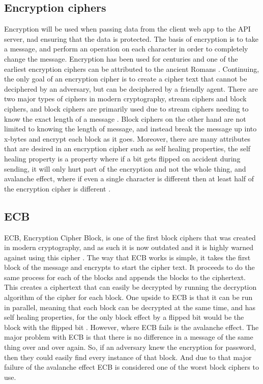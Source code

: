 \documentclass[a4paper, 10pt, draftclsnofoot, onecolumn]{article}
\begin{document}
\begin{center}
\section*{Encryption ciphers}
\end{center}
Encryption will be used when passing data from the client web app to the API server, nad ensuring that the data is protected. The basis of encryption is to take a message, and perform an operation on each character in order to completely change the message. Encryption has been used for centuries and one of the earliest encryption ciphers can be attributed to the ancient Romans \cite{ciphers}. Continuing, the only goal of an encryption cipher is to create a cipher text that cannot be deciphered by an adversary, but can be deciphered by a friendly agent. There are two major types of ciphers in modern cryptography, stream ciphers and block ciphers, and block ciphers are primarily used due to stream ciphers needing to know the exact length of a message \cite{ciphers}. Block ciphers on the other hand are not limited to knowing the length of message, and instead break the message up into x-bytes and encrypt each block as it goes. Moreover, there are many attributes that are desired in an encryption cipher such as self healing properties, the self healing property is a property where if a bit gets flipped on accident during sending, it will only hurt part of the encryption and not the whole thing, and avalanche effect, where if even a single character is different then at least half of the encryption cipher is different \cite{ciphers}. \\

\subsection*{ECB}
ECB, Encryption Cipher Block, is one of the first block ciphers that was created in modern cryptography, and as such it is now outdated and it is highly warned against using this cipher \cite{ciphers}. The way that ECB works is simple, it takes the first block of the message and encrypts to start the cipher text. It proceeds to do the same process for each of the blocks and appends the blocks to the ciphertext.  This creates a ciphertext that can easily be decrypted by running the decryption algorithm of the cipher for each block. One upside to ECB is that it can be run in parallel, meaning that each block can be decrypted at the same time, and has self healing properties, for the only block effect by a flipped bit would be the block with the flipped bit \cite{ciphers}. However, where ECB fails is the avalanche effect. The major problem with ECB is that there is no difference in a message of the same thing over and over again. So, if an adversary knew the encryption for password, then they could easily find every instance of that block. And due to that major failure of the avalanche effect ECB is considered one of the worst block ciphers to use.
\end{document}
